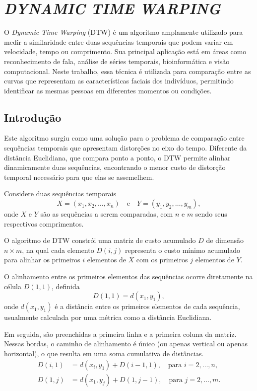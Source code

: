 \chapter{\textit{DYNAMIC TIME WARPING}} \label{cha:dtw}

O \textit{Dynamic Time Warping} (DTW) \cite{tavenard.blog.dtw} é um algoritmo amplamente utilizado para medir a similaridade entre duas sequências temporais que podem variar em velocidade, tempo ou comprimento. Sua principal aplicação está em áreas como reconhecimento de fala, análise de séries temporais, bioinformática e visão computacional. Neste trabalho, essa técnica é utilizada para comparação entre as curvas que representam as características faciais dos indivíduos, permitindo identificar as mesmas pessoas em diferentes momentos ou condições.

\section{Introdução}

Este algoritmo surgiu como uma solução para o problema de comparação entre sequências temporais que apresentam distorções no eixo do tempo. Diferente da distância Euclidiana, que compara ponto a ponto, o DTW permite alinhar dinamicamente duas sequências, encontrando o menor custo de distorção temporal necessário para que elas se assemelhem.

Considere duas sequências temporais
\begin{equation}
    X = (x_1, x_2, \ldots, x_n) \quad \text{e} \quad Y = (y_1, y_2, \ldots, y_m),
\end{equation}
onde \(X\) e \(Y\) são as sequências a serem comparadas, com \(n\) e \(m\) sendo seus respectivos comprimentos.

O algoritmo de DTW constrói uma matriz de custo acumulado \(D\) de dimensão \(n \times m\), na qual cada elemento \(D(i, j)\) representa o custo mínimo acumulado para alinhar os primeiros \(i\) elementos de \(X\) com os primeiros \(j\) elementos de \(Y\).

O alinhamento entre os primeiros elementos das sequências ocorre diretamente na célula \(D(1,1)\), definida
\begin{equation}
    D(1,1) = d(x_1, y_1),
\end{equation}
onde \(d(x_1, y_1)\) é a distância entre os primeiros elementos de cada sequência, usualmente calculada por uma métrica como a distância Euclidiana.

Em seguida, são preenchidas a primeira linha e a primeira coluna da matriz. Nessas bordas, o caminho de alinhamento é único (ou apenas vertical ou apenas horizontal), o que resulta em uma soma cumulativa de distâncias. 
\begin{align}
    D(i,1) &= d(x_i, y_1) + D(i-1,1), \quad \text{para } i = 2, \ldots, n, \\
    D(1,j) &= d(x_1, y_j) + D(1,j-1), \quad \text{para } j = 2, \ldots, m.
\end{align}

